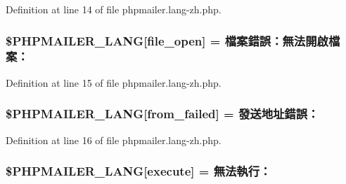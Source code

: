 Definition at line 14 of file phpmailer.\+lang-\/zh.\+php.

\subsubsection[{\texorpdfstring{\$\+P\+H\+P\+M\+A\+I\+L\+E\+R\+\_\+\+L\+A\+NG}{$PHPMAILER_LANG}}]{\setlength{\rightskip}{0pt plus 5cm}\$P\+H\+P\+M\+A\+I\+L\+E\+R\+\_\+\+L\+A\+NG\mbox{[}\textquotesingle{}file\+\_\+open\textquotesingle{}\mbox{]} = \textquotesingle{}檔案錯誤：無法開啟檔案：\textquotesingle{}}\hypertarget{phpmailer_8lang-zh_8php_a28d1a6517bf4c942a0ddd506188ad2e0}{}\label{phpmailer_8lang-zh_8php_a28d1a6517bf4c942a0ddd506188ad2e0}


Definition at line 15 of file phpmailer.\+lang-\/zh.\+php.

\subsubsection[{\texorpdfstring{\$\+P\+H\+P\+M\+A\+I\+L\+E\+R\+\_\+\+L\+A\+NG}{$PHPMAILER_LANG}}]{\setlength{\rightskip}{0pt plus 5cm}\$P\+H\+P\+M\+A\+I\+L\+E\+R\+\_\+\+L\+A\+NG\mbox{[}\textquotesingle{}from\+\_\+failed\textquotesingle{}\mbox{]} = \textquotesingle{}發送地址錯誤：\textquotesingle{}}\hypertarget{phpmailer_8lang-zh_8php_adf832ae12155a09be077c6d5e4fd7e22}{}\label{phpmailer_8lang-zh_8php_adf832ae12155a09be077c6d5e4fd7e22}


Definition at line 16 of file phpmailer.\+lang-\/zh.\+php.

\subsubsection[{\texorpdfstring{\$\+P\+H\+P\+M\+A\+I\+L\+E\+R\+\_\+\+L\+A\+NG}{$PHPMAILER_LANG}}]{\setlength{\rightskip}{0pt plus 5cm}\$P\+H\+P\+M\+A\+I\+L\+E\+R\+\_\+\+L\+A\+NG\mbox{[}\textquotesingle{}execute\textquotesingle{}\mbox{]} = \textquotesingle{}無法執行：\textquotesingle{}}\hypertarget{phpmailer_8lang-zh_8php_a668217a9563a168f30f2a8548b6ed5a9}{}\label{phpmailer_8lang-zh_8php_a668217a9563a168f30f2a8548b6ed5a9}



